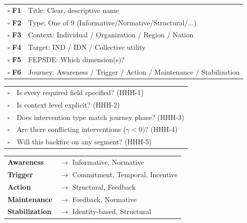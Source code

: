 \documentclass[11pt,a4paper]{article}
\begin{document}
\begin{tcolorbox}[colback=lightgray, colframe=primaryblue, title=\textbf{Light Mode Checklist (F1--F6)}]
\small
\begin{tabular}{@{}rp{10cm}@{}}
$\square$ \textbf{F1} & Title: Clear, descriptive name \\
$\square$ \textbf{F2} & Type: One of 9 (Informative/Normative/Structural/...) \\
$\square$ \textbf{F3} & Context: Individual / Organization / Region / Nation \\
$\square$ \textbf{F4} & Target: IND / IDN / Collective utility \\
$\square$ \textbf{F5} & FEPSDE: Which dimension(s)? \\
$\square$ \textbf{F6} & Journey: Awareness / Trigger / Action / Maintenance / Stabilization \\
\end{tabular}
\end{tcolorbox}

\vspace{1em}

\begin{tcolorbox}[colback=lightgray, colframe=warningorange, title=\textbf{Axiom Violation Checklist}]
\small
\begin{tabular}{@{}rp{10cm}@{}}
$\square$ & Is every required field specified? (HHH-1) \\
$\square$ & Is context level explicit? (HHH-2) \\
$\square$ & Does intervention type match journey phase? (HHH-3) \\
$\square$ & Are there conflicting interventions ($\gamma < 0$)? (HHH-4) \\
$\square$ & Will this backfire on any segment? (HHH-5) \\
\end{tabular}
\end{tcolorbox}

\vspace{1em}

\begin{tcolorbox}[colback=lightgray, colframe=accentgreen, title=\textbf{Journey-Intervention Quick Match}]
\small
\begin{tabular}{@{}ll@{}}
\textbf{Awareness} & $\rightarrow$ Informative, Normative \\
\textbf{Trigger} & $\rightarrow$ Commitment, Temporal, Incentive \\
\textbf{Action} & $\rightarrow$ Structural, Feedback \\
\textbf{Maintenance} & $\rightarrow$ Feedback, Normative \\
\textbf{Stabilization} & $\rightarrow$ Identity-based, Structural \\
\end{tabular}
\end{tcolorbox}
\end{document}
